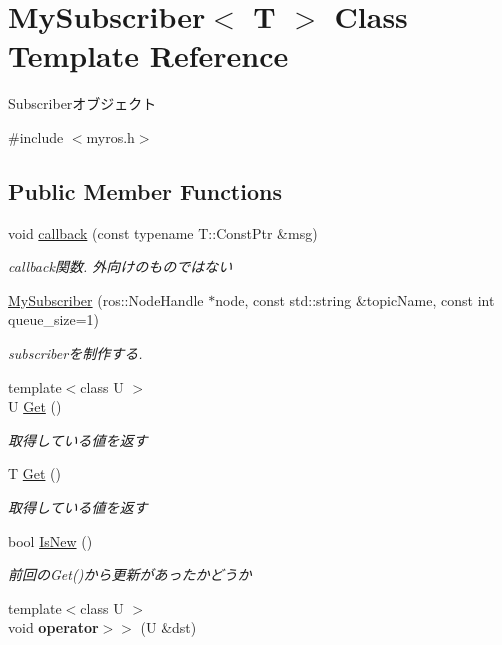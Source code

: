 \section{My\-Subscriber$<$ T $>$ Class Template Reference}
\label{classMySubscriber}


Subscriberオブジェクト  




{\ttfamily \#include $<$myros.\-h$>$}

\subsection*{Public Member Functions}
\begin{DoxyCompactItemize}
\item 
void \hyperlink{classMySubscriber_a48c3a49953cd13c3487873aaee7fc8b2}{callback} (const typename T\-::\-Const\-Ptr \&msg)
\begin{DoxyCompactList}\small\item\em callback関数. 外向けのものではない \end{DoxyCompactList}\item 
\hyperlink{classMySubscriber_a6ab072d202da8fd343997a320b671fba}{My\-Subscriber} (ros\-::\-Node\-Handle $\ast$node, const std\-::string \&topic\-Name, const int queue\-\_\-size=1)
\begin{DoxyCompactList}\small\item\em subscriberを制作する. \end{DoxyCompactList}\item 
{\footnotesize template$<$class U $>$ }\\U \hyperlink{classMySubscriber_a72254fd18a242511f018f0cb47fb8493}{Get} ()
\begin{DoxyCompactList}\small\item\em 取得している値を返す \end{DoxyCompactList}\item 
T \hyperlink{classMySubscriber_a360ba8202d5c72d225925ed6188052be}{Get} ()
\begin{DoxyCompactList}\small\item\em 取得している値を返す \end{DoxyCompactList}\item 
bool \hyperlink{classMySubscriber_ab6fa45cf088da2b7b47530d49d203ccb}{Is\-New} ()
\begin{DoxyCompactList}\small\item\em 前回の\-Get()から更新があったかどうか \end{DoxyCompactList}\item 
{\footnotesize template$<$class U $>$ }\\void {\bfseries operator$>$$>$} (U \&dst)\label{classMySubscriber_a61d722cf8524700d9979280c4a0308ef}

\end{DoxyCompactItemize}


